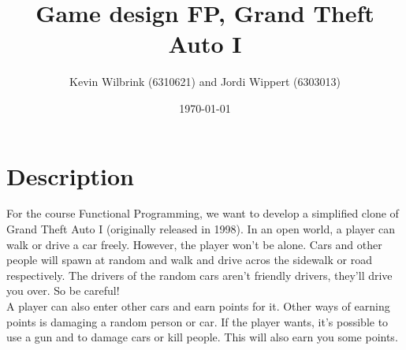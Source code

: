\documentclass[12pt]{article}
\title{\textbf{Game design FP, Grand Theft Auto I}}
\date{\today}
\author{Kevin Wilbrink (6310621) and Jordi Wippert (6303013)}
\begin{document}
	\maketitle

	\section{Description}
	For the course Functional Programming, we want to develop a simplified clone of Grand Theft Auto I (originally released in 1998). In an open world, a player can walk or drive a car freely. However, the player won't be alone. Cars and other people will spawn at random and walk and drive acros the sidewalk or road respectively. The drivers of the random cars aren't friendly drivers, they'll drive you over. So be careful!\\
	A player can also enter other cars and earn points for it. Other ways of earning points is damaging a random person or car. If the player wants, it's possible to use a gun and to damage cars or kill people. This will also earn you some points.
\end{document}

